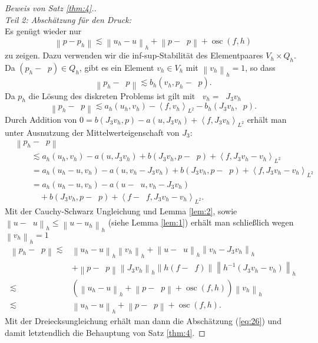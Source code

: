 \documentclass[a4paper]{scrartcl}
\newcommand{\J}[1]{J_{#1}}
\newcommand{\norm}[1]{\left\lVert#1\right\rVert}
\newcommand{\hnorm}[1]{\left\lVert#1\right\rVert_h}
\newcommand{\scpr}[2]{\left\langle#1,#2\right\rangle_{L^2}}
\DeclareMathOperator{\intOp}{I_{NC}}
\DeclareMathOperator{\LtwoOp}{\Pi_0}
\DeclareMathOperator{\osc}{osc}
\theoremstyle{plain}
\theoremstyle{definition}
\theoremstyle{remark}
\begin{document}
\begin{proof}[Beweis von Satz \ref{thm:4}.]
  \textit{\\Teil 2: Abschätzung für den Druck:}\\
  Es genügt wieder nur
  \begin{equation}
    \label{eq:26}
    \norm{p - p_h} \lesssim \hnorm{u_h - u} + \norm{p - \LtwoOp p} + \osc(f,h)
  \end{equation}
  zu zeigen. Dazu verwenden wir die inf-sup-Stabilität des
  Elementpaares \(V_h \times Q_h\). Da \((p_h - \LtwoOp p) \in Q_h\), gibt es ein Element
  \(v_h \in V_h\) mit \(\hnorm{v_h} = 1\), so dass 
  \begin{equation}
    \label{eq:27}
    \norm{p_h - \LtwoOp p} \lesssim b_h(v_h, p_h - \LtwoOp p). 
  \end{equation}
  Da \(p_h\) die Lösung des diskreten Problems ist gilt mit \(\LtwoOp
  v_h = \LtwoOp \J3 v_h\)
  \begin{equation}
    \label{eq:28}
    \norm{p_h - \LtwoOp p} \lesssim a_h(u_h, v_h) - \scpr{f}{v_h} - b_h(\J3 v_h,\LtwoOp p). 
  \end{equation}
  Durch Addition von \(0 = b(\J3 v_h, p) - a(u, \J3 v_h) +
  \scpr{f}{\J3 v_h}\) erhält man unter Ausnutzung der
  Mittelwerteigenschaft von \(\J3\): 
  \begin{align}
    &\norm{p_h - \LtwoOp p} \\
    &\qquad\lesssim a_h(u_h, v_h) - a(u, \J3 v_h) + b(\J3 v_h, p - \LtwoOp p) + \scpr{f}{\J3 v_h - v_h} \nonumber \\
    &\qquad= a_h(u_h - u, v_h) - a(u, v_h - \J3 v_h) + b(\J3 v_h, p - \LtwoOp p) + \scpr{f}{\J3 v_h - v_h} \nonumber \\
    &\qquad= a_h(u_h - u, v_h) - a(u - \intOp u, v_h - \J3 v_h) \nonumber \\
    &\qquad \quad+ b(\J3 v_h, p - \LtwoOp p) + \scpr{f - \LtwoOp f}{\J3 v_h - v_h}. \nonumber 
  \end{align}
  Mit der Cauchy-Schwarz Ungleichung und Lemma \ref{lem:2}, sowie
  \(\hnorm{u - \intOp u} \leq \hnorm{u - u_h}\) (siehe Lemma
  \ref{lem:1}) erhält man schließlich wegen \(\hnorm{v_h} = 1\)
  \begin{align}
    \norm{p_h - \LtwoOp p} \lesssim
    & \hnorm{u_h - u}\hnorm{v_h} + \hnorm{u - \intOp u}\hnorm{v_h - \J3 v_h} \nonumber \\
    &+ \norm{p - \LtwoOp p}\hnorm{\J3 v_h} \norm{h(f - \LtwoOp f)}\hnorm{h^{-1}(\J3 v_h - v_h)} \nonumber \\
    \lesssim& \left(\hnorm{u_h - u} + \norm{p - \LtwoOp p} + \osc(f,h)\right) \hnorm{v_h} \nonumber \\
    \lesssim& \hnorm{u_h - u} + \norm{p - \LtwoOp p} + \osc(f,h). 
  \end{align}
  Mit der Dreiecksungleichung erhält man dann die Abschätzung
  (\ref{eq:26}) und damit letztendlich die Behauptung von Satz
  \ref{thm:4}. 
\end{proof}
\end{document}

